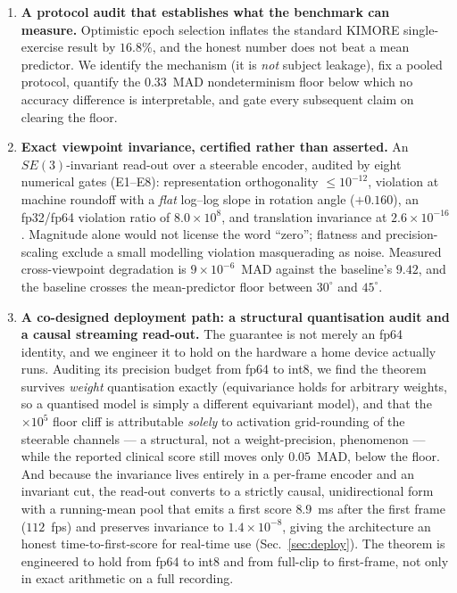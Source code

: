 \documentclass[10pt,journal]{IEEEtran}
\begin{document}
\begin{enumerate}
\item \textbf{A protocol audit that establishes what the benchmark can measure.} Optimistic epoch selection inflates the standard KIMORE single-exercise result by $16.8\%$, and the honest number does not beat a mean predictor. We identify the mechanism (it is \emph{not} subject leakage), fix a pooled protocol, quantify the $0.33$~MAD nondeterminism floor below which no accuracy difference is interpretable, and gate every subsequent claim on clearing the floor.

\item \textbf{Exact viewpoint invariance, certified rather than asserted.} An $SE(3)$-invariant read-out over a steerable encoder, audited by eight numerical gates (E1--E8): representation orthogonality $\le10^{-12}$, violation at machine roundoff with a \emph{flat} log--log slope in rotation angle ($+0.160$), an fp32/fp64 violation ratio of $8.0\times10^{8}$, and translation invariance at $2.6\times10^{-16}$. Magnitude alone would not license the word ``zero''; flatness and precision-scaling exclude a small modelling violation masquerading as noise. Measured cross-viewpoint degradation is $9\times10^{-6}$~MAD against the baseline's $9.42$, and the baseline crosses the mean-predictor floor between $30^\circ$ and $45^\circ$.

\item \textbf{A co-designed deployment path: a structural quantisation audit and a causal streaming read-out.} The guarantee is not merely an fp64 identity, and we engineer it to hold on the hardware a home device actually runs. Auditing its precision budget from fp64 to int8, we find the theorem survives \emph{weight} quantisation exactly (equivariance holds for arbitrary weights, so a quantised model is simply a different equivariant model), and that the $\times10^{5}$ floor cliff is attributable \emph{solely} to activation grid-rounding of the steerable channels --- a structural, not a weight-precision, phenomenon --- while the reported clinical score still moves only $0.05$~MAD, below the floor. And because the invariance lives entirely in a per-frame encoder and an invariant cut, the read-out converts to a strictly causal, unidirectional form with a running-mean pool that emits a first score $8.9$~ms after the first frame ($112$~fps) and preserves invariance to $1.4\times10^{-8}$, giving the architecture an honest time-to-first-score for real-time use (Sec.~\ref{sec:deploy}). The theorem is engineered to hold from fp64 to int8 and from full-clip to first-frame, not only in exact arithmetic on a full recording.


\end{enumerate}
\end{document}
